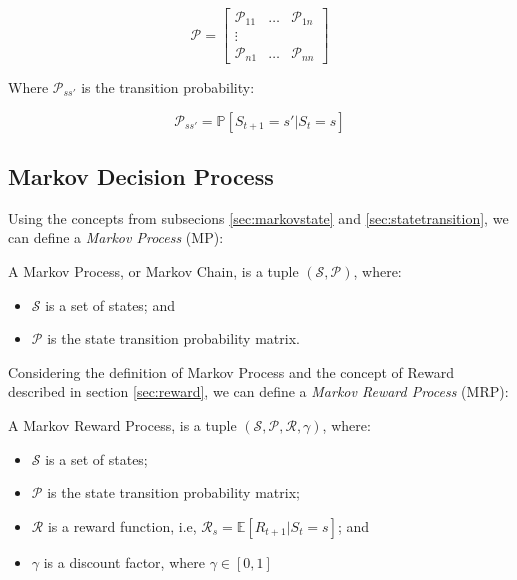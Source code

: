 \begin{equation}
\mathcal{P} = \begin{bmatrix}
\mathcal{P}_{11} &  \dots  & \mathcal{P}_{1n} \\
\vdots \\
\mathcal{P}_{n1} &  \dots  & \mathcal{P}_{nn} 
\end{bmatrix}
\end{equation}

Where $\mathcal{P}_{ss'}$ is the transition probability:

\begin{equation}
\mathcal{P}_{ss'} = \mathbb{P}[S_{t+1} = s' | S_{t} = s]
\end{equation}

\subsection{Markov Decision Process}

Using the concepts from subsecions \ref{sec:markovstate} and \ref{sec:statetransition}, we can define a \textit{Markov Process} (MP):

\begin{definition}
	A Markov Process, or Markov Chain, is a tuple $(\mathcal{S}, \mathcal{P})$, where:
	\begin{itemize}
		\item $\mathcal{S}$ is a set of states; and
		\item $\mathcal{P}$ is the state transition probability matrix.
	\end{itemize}
\end{definition}

Considering the definition of Markov Process and the concept of Reward described in section \ref{sec:reward}, we can define a \textit{Markov Reward Process} (MRP):

\begin{definition}
	A Markov Reward Process, is a tuple $(\mathcal{S}, \mathcal{P}, \mathcal{R}, \gamma)$, where:
	\begin{itemize}
		\item $\mathcal{S}$ is a set of states; 
		\item $\mathcal{P}$ is the state transition probability matrix;
		\item $\mathcal{R}$ is a reward function, i.e, $\mathcal{R}_{s} = \mathbb{E}[R_{t+1} | S_{t} = s]$; and
		\item $\gamma$ is a discount factor, where $\gamma \in [0,1]$
	\end{itemize}
\end{definition}

